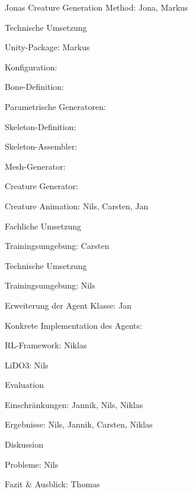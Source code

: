 \begin{thallok}
\begin{thallok}
\begin{thallok}
\begin{thallok}
					\item Jonas Creature Generation Method: Jona, Markus
				\end{thallok}
			\item Technische Umsetzung
				\begin{thallok}
					\item Unity-Package: Markus
					\item Konfiguration:
					\item Bone-Definition: 
					\item Parametrische Generatoren: 
					\item Skeleton-Definition: 
					\item Skeleton-Assembler:
					\item Mesh-Generator:
					\item Creature Generator:
				\end{thallok}
		\end{thallok}
		\item Creature Animation: Nils, Carsten, Jan
		\begin{thallok}
			\item Fachliche Umsetzung
				\begin{thallok}
					\item Trainingsumgebung: Carsten
				\end{thallok}
			\item Technische Umsetzung
				\begin{thallok}
					\item Trainingsumgebung: Nils
					\item Erweiterung der Agent Klasse: Jan
					\item Konkrete Implementation des Agents:
					\item RL-Framework: Niklas
					\item LiDO3: Nils
				\end{thallok}
		\end{thallok}
	\end{thallok}
	\item Evaluation
	\begin{thallok}
		\item Einschränkungen: Jannik, Nils, Niklas
		\item Ergebnisse: Nils, Jannik, Carsten, Niklas
		\item Diskussion
		\item Probleme: Nils
	\end{thallok}
	\item Fazit \& Ausblick: Thomas
\end{thallok}

